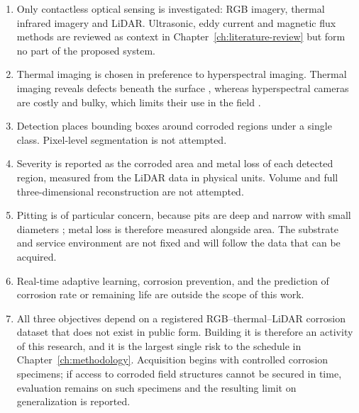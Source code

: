 \begin{enumerate}[label=\arabic*),leftmargin=*,itemsep=5pt]
  \item Only contactless optical sensing is investigated: RGB imagery, thermal
        infrared imagery and LiDAR. Ultrasonic, eddy current and magnetic flux
        methods are reviewed as context in Chapter~\ref{ch:literature-review}
        but form no part of the proposed system.
  \item Thermal imaging is chosen in preference to hyperspectral imaging.
        Thermal imaging reveals defects beneath the surface
        \citep{Lim2021,Li2024c,Guedes2025}, whereas hyperspectral cameras are
        costly and bulky, which limits their use in the field \citep{Tang2025}.
  \item Detection places bounding boxes around corroded regions under a single
        class. Pixel-level segmentation is not attempted.
  \item Severity is reported as the corroded area and metal loss of each
        detected region, measured from the LiDAR data in physical units.
        Volume and full three-dimensional reconstruction are not attempted.
  \item Pitting is of particular concern, because pits are deep and narrow
        with small diameters \citep{Soares2023}; metal loss is
        therefore measured alongside area. The substrate and service
        environment are not fixed and will follow the data that can be
        acquired.
  \item Real-time adaptive learning, corrosion prevention, and the prediction
        of corrosion rate or remaining life are outside the scope of this work.
  \item All three objectives depend on a registered RGB--thermal--LiDAR
        corrosion dataset that does not exist in public form. Building it is
        therefore an activity of this research, and it is the largest single
        risk to the schedule in Chapter~\ref{ch:methodology}. Acquisition
        begins with controlled corrosion specimens; if access to corroded field
        structures cannot be secured in time, evaluation remains on such
        specimens and the resulting limit on generalization is reported.
\end{enumerate}

